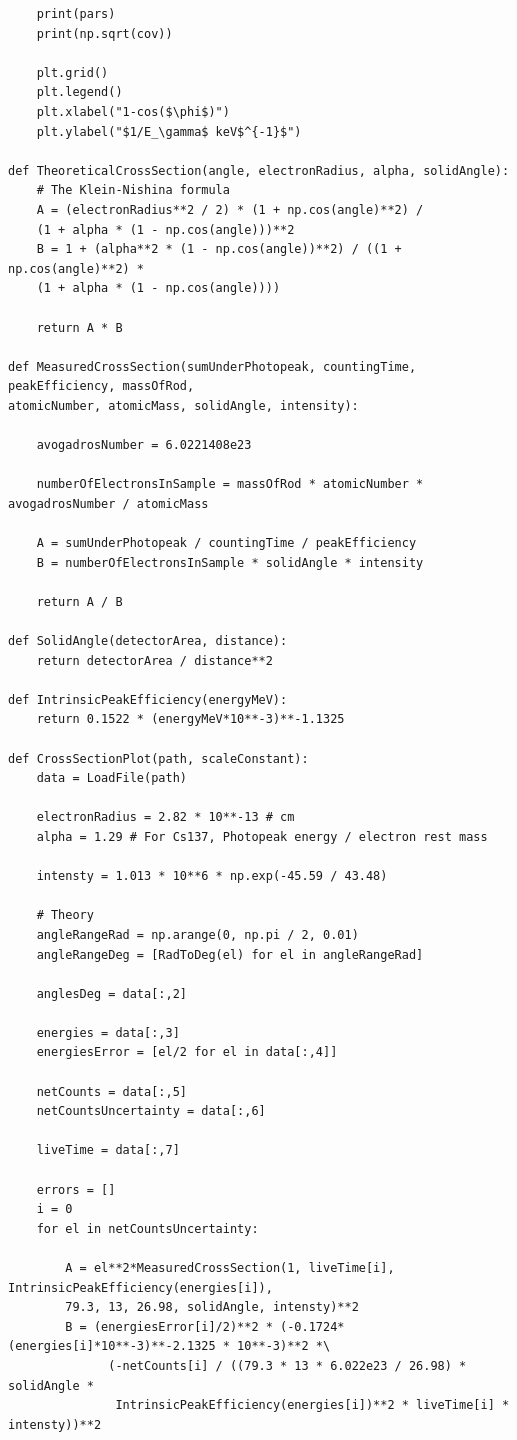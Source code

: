 \documentclass[%
reprint,
amsmath,amssymb,
aps,
floatfix
]{revtex4-2}
\begin{document}
\begin{lstlisting}
    print(pars)
    print(np.sqrt(cov))

    plt.grid()
    plt.legend()
    plt.xlabel("1-cos($\phi$)")
    plt.ylabel("$1/E_\gamma$ keV$^{-1}$")
    
def TheoreticalCrossSection(angle, electronRadius, alpha, solidAngle):
    # The Klein-Nishina formula
    A = (electronRadius**2 / 2) * (1 + np.cos(angle)**2) / 
    (1 + alpha * (1 - np.cos(angle)))**2
    B = 1 + (alpha**2 * (1 - np.cos(angle))**2) / ((1 + np.cos(angle)**2) * 
    (1 + alpha * (1 - np.cos(angle))))

    return A * B
    
def MeasuredCrossSection(sumUnderPhotopeak, countingTime, peakEfficiency, massOfRod, 
atomicNumber, atomicMass, solidAngle, intensity):
    
    avogadrosNumber = 6.0221408e23

    numberOfElectronsInSample = massOfRod * atomicNumber * avogadrosNumber / atomicMass
    
    A = sumUnderPhotopeak / countingTime / peakEfficiency
    B = numberOfElectronsInSample * solidAngle * intensity

    return A / B
    
def SolidAngle(detectorArea, distance):
    return detectorArea / distance**2

def IntrinsicPeakEfficiency(energyMeV):
    return 0.1522 * (energyMeV*10**-3)**-1.1325
    
def CrossSectionPlot(path, scaleConstant):
    data = LoadFile(path)

    electronRadius = 2.82 * 10**-13 # cm
    alpha = 1.29 # For Cs137, Photopeak energy / electron rest mass

    intensty = 1.013 * 10**6 * np.exp(-45.59 / 43.48)

    # Theory
    angleRangeRad = np.arange(0, np.pi / 2, 0.01)
    angleRangeDeg = [RadToDeg(el) for el in angleRangeRad]

    anglesDeg = data[:,2]

    energies = data[:,3]
    energiesError = [el/2 for el in data[:,4]]

    netCounts = data[:,5]
    netCountsUncertainty = data[:,6]

    liveTime = data[:,7]

    errors = []
    i = 0
    for el in netCountsUncertainty:
        
        A = el**2*MeasuredCrossSection(1, liveTime[i], IntrinsicPeakEfficiency(energies[i]), 
        79.3, 13, 26.98, solidAngle, intensty)**2
        B = (energiesError[i]/2)**2 * (-0.1724*(energies[i]*10**-3)**-2.1325 * 10**-3)**2 *\
              (-netCounts[i] / ((79.3 * 13 * 6.022e23 / 26.98) * solidAngle *
               IntrinsicPeakEfficiency(energies[i])**2 * liveTime[i] * intensty))**2
        

\end{lstlisting}
\end{document}
